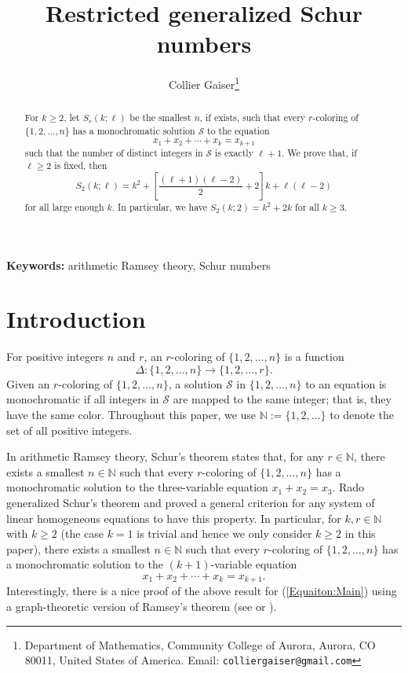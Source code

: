 \documentclass[11pt]{article}
\title{Restricted generalized Schur numbers}
\author{Collier Gaiser\thanks{Department of Mathematics, Community College of Aurora, Aurora, CO 80011,  United States of America. Email: {\tt colliergaiser@gmail.com}}
}
\date{}
\theoremstyle{definition}
\begin{document}
\maketitle


\maketitle
\begin{abstract}
For $k\geq2$, let $S_r(k;\ell)$ be the smallest $n$, if exists, such that every $r$-coloring of $\{1,2,\ldots,n\}$ has a monochromatic solution $\mathcal{S}$ to the equation
\[
x_1+x_2+\cdots+x_k=x_{k+1}
\]
such that the number of distinct integers in $\mathcal{S}$ is exactly $\ell+1$. We prove that, if $\ell\geq2$ is fixed, then
\[
S_2(k;\ell)= k^2+\left[\frac{(\ell+1)(\ell-2)}{2}+2\right]k+\ell(\ell-2)
\]
for all large enough $k$. In particular, we have $S_2(k;2)=k^2+2k$ for all $k\geq3$.
\end{abstract}

{\small \textbf{Keywords:} arithmetic Ramsey theory, Schur numbers} \\

\maketitle

\section{Introduction}\label{Section:Intro}
For positive integers $n$ and $r$, an $r$-coloring of $\{1,2,\ldots,n\}$ is a function \[\Delta:\{1,2,\ldots,n\}\to\{1,2,\ldots,r\}.\] Given an $r$-coloring of $\{1,2,\ldots,n\}$, a solution $\mathcal{S}$ in $\{1,2,\ldots,n\}$ to an equation is monochromatic if all integers in $\mathcal{S}$ are mapped to the same integer; that is, they have the same color. Throughout this paper, we use $\mathbb{N}:=\{1,2,\ldots\}$ to denote the set of all positive integers.

In arithmetic Ramsey theory, Schur's theorem \cite{Schur1916} states that, for any $r\in\mathbb{N}$, there exists a smallest $n\in\mathbb{N}$ such that every $r$-coloring of $\{1,2,\ldots,n\}$ has a monochromatic solution to the three-variable equation $x_1+x_2=x_3$. Rado \cite{Rado1933} generalized Schur's theorem and proved a general criterion for any system of linear homogeneous equations to have this property. In particular, for $k,r\in\mathbb{N}$ with $k\geq2$ (the case $k=1$ is trivial and hence we only consider $k\geq2$ in this paper), there exists a smallest $n\in\mathbb{N}$ such that every $r$-coloring of $\{1,2,\ldots,n\}$ has a monochromatic solution to the $(k+1)$-variable equation
\begin{equation}\label{Equaiton:Main}
x_1+x_2+\cdots+x_k=x_{k+1}.
\end{equation}
Interestingly, there is a nice proof of the above result for (\ref{Equaiton:Main}) using a graph-theoretic version of Ramsey's theorem (see \cite[p.~223 and p.~236]{LR2014} or \cite[p.~159]{Robertson2000}).
\end{document}
